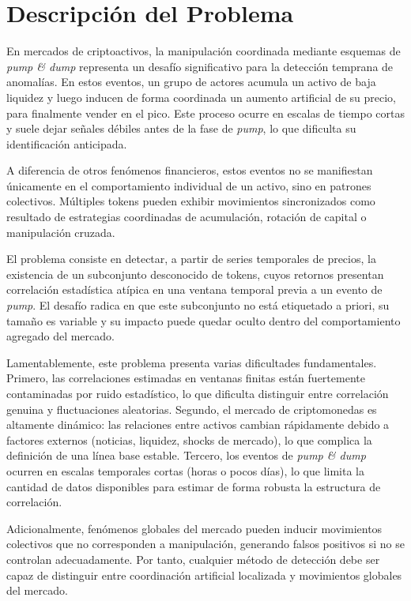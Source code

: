 \section{Descripción del Problema}

En mercados de criptoactivos, la manipulación coordinada mediante esquemas de \emph{pump \& dump} representa un desafío significativo para la detección temprana de anomalías. En estos eventos, un grupo de actores acumula un activo de baja liquidez y luego inducen de forma coordinada un aumento artificial de su precio, para finalmente vender en el pico. Este proceso ocurre en escalas de tiempo cortas y suele dejar señales débiles antes de la fase de \emph{pump}, lo que dificulta su identificación anticipada.

A diferencia de otros fenómenos financieros, estos eventos no se manifiestan únicamente en el comportamiento individual de un activo, sino en patrones colectivos. Múltiples tokens pueden exhibir movimientos sincronizados como resultado de estrategias coordinadas de acumulación, rotación de capital o manipulación cruzada. 

El problema consiste en detectar, a partir de series temporales de precios, la existencia de un subconjunto desconocido de tokens, cuyos retornos presentan correlación estadística atípica en una ventana temporal previa a un evento de \emph{pump}. El desafío radica en que este subconjunto no está etiquetado a priori, su tamaño es variable y su impacto puede quedar oculto dentro del comportamiento agregado del mercado.

Lamentablemente, este problema presenta varias dificultades fundamentales. Primero, las correlaciones estimadas en ventanas finitas están fuertemente contaminadas por ruido estadístico, lo que dificulta distinguir entre correlación genuina y fluctuaciones aleatorias. Segundo, el mercado de criptomonedas es altamente dinámico: las relaciones entre activos cambian rápidamente debido a factores externos (noticias, liquidez, shocks de mercado), lo que complica la definición de una línea base estable. Tercero, los eventos de \emph{pump \& dump} ocurren en escalas temporales cortas (horas o pocos días), lo que limita la cantidad de datos disponibles para estimar de forma robusta la estructura de correlación.

Adicionalmente, fenómenos globales del mercado pueden inducir movimientos
colectivos que no corresponden a manipulación, generando falsos positivos si no se controlan adecuadamente. Por tanto, cualquier método de detección debe ser capaz de distinguir entre coordinación artificial localizada y movimientos globales del mercado.

